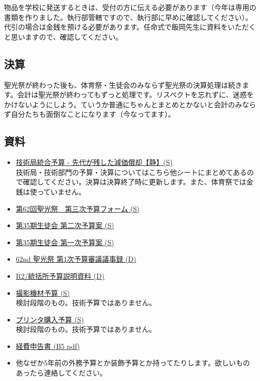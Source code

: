 \documentclass[dvipdfmx,jb5]{jreport}
\begin{document}
物品を学校に発送するときは、受付の方に伝える必要があります（今年は専用の書類を作りました。執行部管轄ですので、執行部に早めに確認してください）。代引の場合は金銭を預ける必要があります。任命式で飯岡先生に資料をいただくと思いますので、確認してください。

\subsection{決算}
聖光祭が終わった後も、体育祭・生徒会のみならず聖光祭の決算処理は続きます。会計は聖光祭が終わってもずっと処理です。リスペクトを忘れずに、迷惑をかけないようにしよう。ていうか普通にちゃんとまとめとかないと会計のみならず自分たちも面倒なことになります（今なってます）。

\subsection{資料}
\begin{itemize}
      \item \href{https://docs.google.com/spreadsheets/d/1cCHlfuN5FRR4mlCLDqwohB5WyJ2stmBoUM762DVa7aM/edit##gid=848718781}{技術局統合予算 - 先代が残した減価償却【静】(S)}
            \\ 技術局・技術部門の予算・決算についてはこちら他シートにまとめてあるので確認してください。決算は決算終了時に更新します。また、体育祭では金銭は使っていません。
      \item \href{https://docs.google.com/spreadsheets/d/1Tg_4jKLywMSQpIjNebaPKgTH9YmPqoLZAOGBRs1sr7I/edit?usp=sharing}{第62回聖光祭　第三次予算フォーム (S)}
      \item \href{https://docs.google.com/spreadsheets/d/1zZcA076Hvox9dDIvhHAMnmiIAQI0af1ChN1slH4WyVw/edit?usp=sharing}{第35期生徒会 第二次予算案 (S)}
      \item \href{https://docs.google.com/spreadsheets/d/1uNOAvcq1S3ErZTklh8G7kT6zPYlna-8pR9Jqv2RYYKc/edit?usp=sharing}{第35期生徒会 第一次予算案 (S)}
      \item \href{https://docs.google.com/document/d/1hR_gEl9qHiXGgSxzFDBNH7U6hyPKhjvPEHOStIhGmo8/edit?usp=sharing}{62nd 聖光祭 第1次予算審議議事録 (D)}
      \item \href{https://docs.google.com/document/d/1brt8Fwv7bYzFQlV_zTF3Tmtmhg8zD4gGt-oBMQM-7Iw/edit?usp=sharing}{R2/統括所予算説明資料 (D)}
      \item \href{https://docs.google.com/spreadsheets/d/1tlZiJdgfzjbsGDRE5cx0bnHmj2DNoOukDPuPQMx2N5g/edit?usp=sharing}{撮影機材予算 (S)}
            \\検討段階のもの。技術予算ではありません。
      \item \href{https://docs.google.com/spreadsheets/d/1-HWo9Lh8epNt7tHbg88feTvWC146bmrN0XXh0YFmPzU/edit?usp=sharing}{プリンタ購入予算 (S)}
            \\検討段階のもの。技術予算ではありません。
      \item \href{https://drive.google.com/file/d/1TN5O2NX7dg8xD_-Y-93Du-caYc1XWezX/view?usp=sharing}{経費申告書 (B5 pdf)}
      \item 他なぜか5年前の外務予算とか装飾予算とか持ってたりします。欲しいものあったら連絡してください。
\end{itemize}
\end{document}
